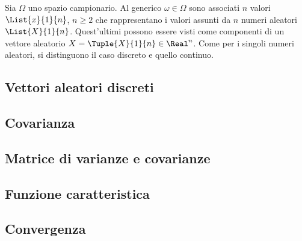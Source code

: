 \documentclass{subfiles}
\begin{document}
Sia $\Omega$ uno spazio campionario. Al generico $\omega \in \Omega$ sono associati $n$ valori \(\List{x}{1}{n}\),
$n \ge 2$ che rappresentano i valori assunti da $n$ numeri aleatori \(\List{X}{1}{n}\).
Quest'ultimi possono essere visti come componenti di un vettore aleatorio $X = \Tuple{X}{1}{n} \in \Real^{n}$.
Come per i singoli numeri aleatori, si distinguono il caso discreto e quello continuo.

\subsection{Vettori aleatori discreti}

\clearpage

\subsection{Covarianza}


\subsection{Matrice di varianze e covarianze}

\clearpage

\subsection{Funzione caratteristica}


\subsection{Convergenza}

\end{document}

